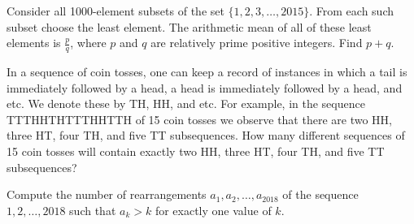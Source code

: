 \documentclass[mast]{lucky}
\begin{document}
     \begin{req}[AIME I 2015/12]{6}
Consider all 1000-element subsets of the set $\{1, 2, 3,\ldots,2015\}.$ From each such subset choose the least element. The arithmetic mean of all of these least elements is $\frac{p}{q}$, where $p$ and $q$ are relatively prime positive integers. Find $p + q$.
\end{req}
    
     \begin{prob}[AIME 1986/13]{9}
In a sequence of coin tosses, one can keep a record of instances in which a tail is immediately followed by a head, a head is immediately followed by a head, and etc. We denote these by TH, HH, and etc. For example, in the sequence TTTHHTHTTTHHTTH of 15 coin tosses we observe that there are two HH, three HT, four TH, and five TT subsequences. How many different sequences of 15 coin tosses will contain exactly two HH, three HT, four TH, and five TT subsequences?
\end{prob}
    
     \begin{prob}[CMIMC 2018]{13}
Compute the number of rearrangements $a_1,a_2,\ldots,a_{2018}$ of the sequence $1,2,\ldots,2018$ such that $a_k>k$ for exactly one value of $k.$
\end{prob}
\end{document}
